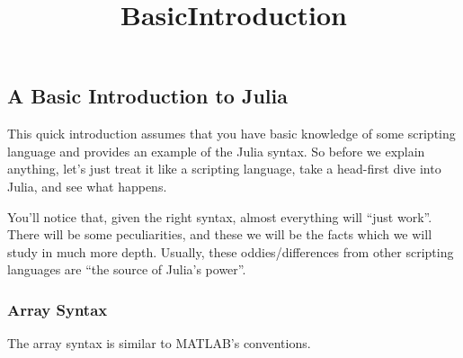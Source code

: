 \documentclass[11pt]{article}
\title{BasicIntroduction}
\begin{document}
    
    
    \maketitle
    
    

    
    \subsection{A Basic Introduction to
Julia}\label{a-basic-introduction-to-julia}

This quick introduction assumes that you have basic knowledge of some
scripting language and provides an example of the Julia syntax. So
before we explain anything, let's just treat it like a scripting
language, take a head-first dive into Julia, and see what happens.

You'll notice that, given the right syntax, almost everything will
``just work''. There will be some peculiarities, and these we will be
the facts which we will study in much more depth. Usually, these
oddies/differences from other scripting languages are ``the source of
Julia's power''.

    \subsubsection{Array Syntax}\label{array-syntax}

The array syntax is similar to MATLAB's conventions.
\end{document}
